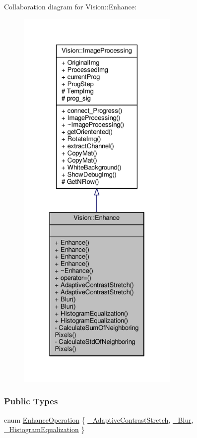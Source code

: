 Collaboration diagram for Vision\+:\+:Enhance\+:
\nopagebreak
\begin{figure}[H]
\begin{center}
\leavevmode
\includegraphics[height=550pt]{class_vision_1_1_enhance__coll__graph}
\end{center}
\end{figure}
\subsubsection*{Public Types}
\begin{DoxyCompactItemize}
\item 
enum \hyperlink{class_vision_1_1_enhance_a36caf2ddf5cb2575bfae8bcdca04e58e}{Enhance\+Operation} \{ \hyperlink{class_vision_1_1_enhance_a36caf2ddf5cb2575bfae8bcdca04e58eae6586f260ee8f32c3b9497731524e9ae}{\+\_\+\+Adaptive\+Contrast\+Stretch}, 
\hyperlink{class_vision_1_1_enhance_a36caf2ddf5cb2575bfae8bcdca04e58ea5245bfc56341cd91a53b2fcb676c8fc8}{\+\_\+\+Blur}, 
\hyperlink{class_vision_1_1_enhance_a36caf2ddf5cb2575bfae8bcdca04e58eaa1c2d6e2989e60cf5a5f0c320f83bc08}{\+\_\+\+Histogram\+Equalization}
 \}
\end{DoxyCompactItemize}
